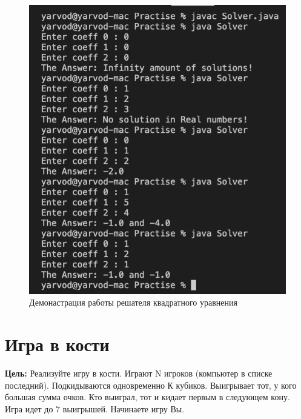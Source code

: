 \documentclass[a4paper]{article}
\begin{document}
\begin{figure}[H]
    \begin{center}
        \includegraphics[scale = 0.5]{solution_1.png}
        \caption{Демонастрация работы решателя квадратного уравнения}
        \label{sol_1}
    \end{center}
\end{figure}


\section{Игра в кости}

\textbf{Цель:} Реализуйте игру в кости. Играют N игроков (компьютер в списке последний). Подкидываются одновременно К кубиков. Выигрывает тот, у кого большая сумма очков. Кто выиграл, тот и кидает первым в следующем кону. Игра идет до 7 выигрышей. Начинаете игру Вы. \par 
\end{document}
